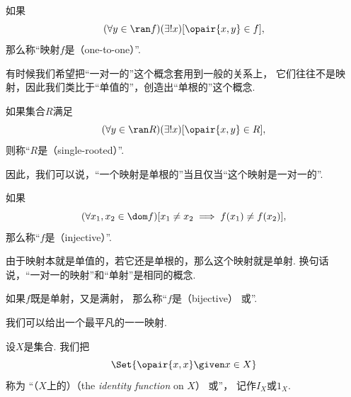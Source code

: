 如果\begin{equation*}
	(\forall y \in \ran f)
	(\exists! x)
	[\opair{x,y} \in f],
\end{equation*}
那么称“映射\(f\)是（one-to-one）”.

有时候我们希望把“一对一的”这个概念套用到一般的关系上，
它们往往不是映射，因此我们类比于“单值的”，创造出“单根的”这个概念.
\begin{definition}
如果集合\(R\)满足\begin{equation*}
	(\forall y \in \ran R)
	(\exists! x)
	[\opair{x,y} \in R],
\end{equation*}
则称“\(R\)是（single-rooted）”.
\end{definition}

因此，我们可以说，“一个映射是单根的”当且仅当“这个映射是一对一的”.

如果\begin{equation*}
	(\forall x_1, x_2 \in \dom f)
	[x_1 \neq x_2 \implies f(x_1) \neq f(x_2)],
\end{equation*}
那么称“\(f\)是（injective）”.

由于映射本就是单值的，若它还是单根的，那么这个映射就是单射.
换句话说，“一对一的映射”和“单射”是相同的概念.

如果\(f\)既是单射，又是满射，
那么称“\(f\)是（bijective）
或”.

我们可以给出一个最平凡的一一映射.
\begin{definition}
设\(X\)是集合.
我们把\begin{equation*}
	\Set{ \opair{x,x} \given x \in X }
\end{equation*}称为
“（\(X\)上的）（the \emph{identity function} on \(X\)）
或”，
记作\(I_X\)或\(1_X\).
\end{definition}

